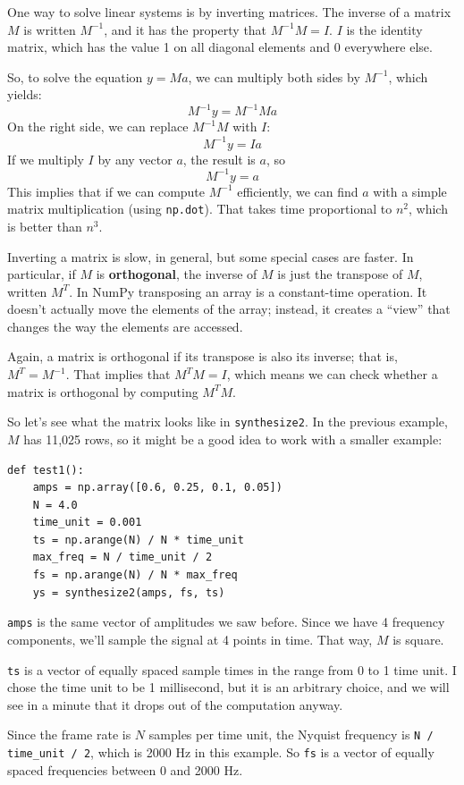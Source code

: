 \documentclass[12pt]{book}
\begin{document}
One way to solve linear systems is by inverting matrices.  The
inverse of a matrix $M$ is written $M^{-1}$, and it has the property
that $M^{-1}M = I$.  $I$ is the identity matrix, which has
the value 1 on all diagonal elements and 0 everywhere else.

So, to solve the equation $y = Ma$, we can multiply both sides by
$M^{-1}$, which yields:
%
\[ M^{-1}y = M^{-1} M a \]
%
On the right side, we can replace $M^{-1}M$ with $I$:
%
\[ M^{-1}y = I a \]
%
If we multiply $I$ by any vector $a$, the result is $a$, so  
%
\[ M^{-1}y = a \]
%
This implies that if we can compute $M^{-1}$ efficiently, we can find
$a$ with a simple matrix multiplication (using {\tt np.dot}).  That
takes time proportional to $n^2$, which is better than $n^3$.

Inverting a matrix is slow, in general, but some special cases are
faster.  In particular, if $M$ is {\bf orthogonal}, the inverse of $M$
is just the transpose of $M$, written $M^T$.  In NumPy
transposing an array is a constant-time operation.  It
doesn't actually move the elements of the array; instead, it creates a
``view'' that changes the way the elements are accessed.

Again, a matrix is orthogonal if its transpose is also its inverse;
that is, $M^T = M^{-1}$.  That implies that $M^TM = I$, which means we
can check whether a matrix is orthogonal by computing $M^TM$.

So let's see what the matrix looks like in {\tt synthesize2}.  In 
the previous example, $M$ has 11,025 rows, so it might be a good idea
to work with a smaller example:

\begin{verbatim}
def test1():
    amps = np.array([0.6, 0.25, 0.1, 0.05])
    N = 4.0
    time_unit = 0.001
    ts = np.arange(N) / N * time_unit
    max_freq = N / time_unit / 2
    fs = np.arange(N) / N * max_freq
    ys = synthesize2(amps, fs, ts)
\end{verbatim}

{\tt amps} is the same vector of amplitudes we saw before.
Since we have 4 frequency components, we'll sample the signal
at 4 points in time.  That way, $M$ is square.

{\tt ts} is a vector of equally spaced sample times in the range from
0 to 1 time unit.  I chose the time unit to be 1 millisecond, but it
is an arbitrary choice, and we will see in a minute that it drops out
of the computation anyway.

Since the frame rate is $N$ samples per time unit, the Nyquist
frequency is \verb"N / time_unit / 2", which is 2000 Hz in this
example.  So {\tt fs} is a vector of equally spaced frequencies
between 0 and 2000 Hz.
\end{document}
